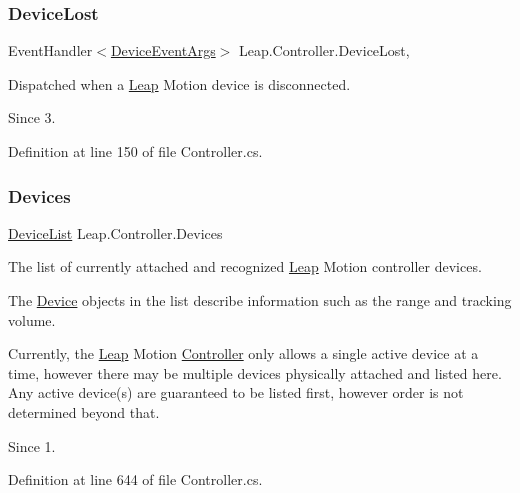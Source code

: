 \subsubsection{\texorpdfstring{DeviceLost}{DeviceLost}}
{\footnotesize\ttfamily Event\+Handler$<$\mbox{\hyperlink{class_leap_1_1_device_event_args}{Device\+Event\+Args}}$>$ Leap.\+Controller.\+Device\+Lost\hspace{0.3cm}{\ttfamily [add]}, {\ttfamily [remove]}}



Dispatched when a \mbox{\hyperlink{namespace_leap}{Leap}} Motion device is disconnected. 

\begin{DoxySince}{Since}
3. 
\end{DoxySince}


Definition at line 150 of file Controller.\+cs.

\mbox{\label{class_leap_1_1_controller_aa5e641f54418e5194161ac45dc15c7fb}} 
\subsubsection{\texorpdfstring{Devices}{Devices}}
{\footnotesize\ttfamily \mbox{\hyperlink{class_leap_1_1_device_list}{Device\+List}} Leap.\+Controller.\+Devices\hspace{0.3cm}{\ttfamily [get]}}



The list of currently attached and recognized \mbox{\hyperlink{namespace_leap}{Leap}} Motion controller devices. 

The \mbox{\hyperlink{class_leap_1_1_device}{Device}} objects in the list describe information such as the range and tracking volume.

Currently, the \mbox{\hyperlink{namespace_leap}{Leap}} Motion \mbox{\hyperlink{class_leap_1_1_controller}{Controller}} only allows a single active device at a time, however there may be multiple devices physically attached and listed here. Any active device(s) are guaranteed to be listed first, however order is not determined beyond that.

\begin{DoxySince}{Since}
1. 
\end{DoxySince}


Definition at line 644 of file Controller.\+cs.

